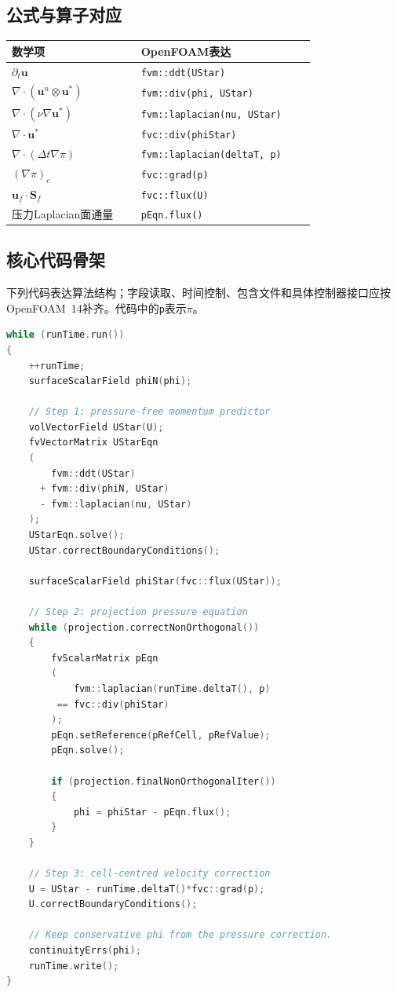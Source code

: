 \documentclass[UTF8,12pt,a4paper]{ctexart}
\numberwithin{equation}{section}
\newcommand{\dt}{\Delta t}
\begin{document}
\subsection{公式与算子对应}
\begin{longtable}{p{0.37\linewidth}p{0.50\linewidth}}
\toprule
数学项 & OpenFOAM表达\\
\midrule
$\partial_t\bm u$ & \texttt{fvm::ddt(UStar)}\\
$\nabla\cdot(\bm u^n\otimes\bm u^*)$ & \texttt{fvm::div(phi, UStar)}\\
$\nabla\cdot(\nu\nabla\bm u^*)$ & \texttt{fvm::laplacian(nu, UStar)}\\
$\nabla\cdot\bm u^*$ & \texttt{fvc::div(phiStar)}\\
$\nabla\cdot(\dt\nabla\pi)$ & \texttt{fvm::laplacian(deltaT, p)}\\
$(\nabla\pi)_c$ & \texttt{fvc::grad(p)}\\
$\bm u_f\cdot\bm S_f$ & \texttt{fvc::flux(U)}\\
压力Laplacian面通量 & \texttt{pEqn.flux()}\\
\bottomrule
\end{longtable}

\subsection{核心代码骨架}
下列代码表达算法结构；字段读取、时间控制、包含文件和具体控制器接口应按OpenFOAM~14补齐。代码中的\texttt{p}表示$\pi$。
\begin{lstlisting}[style=foam,language=C++]
while (runTime.run())
{
    ++runTime;
    surfaceScalarField phiN(phi);

    // Step 1: pressure-free momentum predictor
    volVectorField UStar(U);
    fvVectorMatrix UStarEqn
    (
        fvm::ddt(UStar)
      + fvm::div(phiN, UStar)
      - fvm::laplacian(nu, UStar)
    );
    UStarEqn.solve();
    UStar.correctBoundaryConditions();

    surfaceScalarField phiStar(fvc::flux(UStar));

    // Step 2: projection pressure equation
    while (projection.correctNonOrthogonal())
    {
        fvScalarMatrix pEqn
        (
            fvm::laplacian(runTime.deltaT(), p)
         == fvc::div(phiStar)
        );
        pEqn.setReference(pRefCell, pRefValue);
        pEqn.solve();

        if (projection.finalNonOrthogonalIter())
        {
            phi = phiStar - pEqn.flux();
        }
    }

    // Step 3: cell-centred velocity correction
    U = UStar - runTime.deltaT()*fvc::grad(p);
    U.correctBoundaryConditions();

    // Keep conservative phi from the pressure correction.
    continuityErrs(phi);
    runTime.write();
}
\end{lstlisting}
\end{document}
